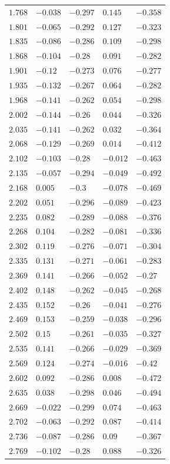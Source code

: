 \begin{center}
\begin{longtable}{lllll}
$1.768$&$-0.038$&$-0.297$&$0.145$&$-0.358$\\
$1.801$&$-0.065$&$-0.292$&$0.127$&$-0.323$\\
$1.835$&$-0.086$&$-0.286$&$0.109$&$-0.298$\\
$1.868$&$-0.104$&$-0.28$&$0.091$&$-0.282$\\
$1.901$&$-0.12$&$-0.273$&$0.076$&$-0.277$\\
$1.935$&$-0.132$&$-0.267$&$0.064$&$-0.282$\\
$1.968$&$-0.141$&$-0.262$&$0.054$&$-0.298$\\
$2.002$&$-0.144$&$-0.26$&$0.044$&$-0.326$\\
$2.035$&$-0.141$&$-0.262$&$0.032$&$-0.364$\\
$2.068$&$-0.129$&$-0.269$&$0.014$&$-0.412$\\
$2.102$&$-0.103$&$-0.28$&$-0.012$&$-0.463$\\
$2.135$&$-0.057$&$-0.294$&$-0.049$&$-0.492$\\
$2.168$&$0.005$&$-0.3$&$-0.078$&$-0.469$\\
$2.202$&$0.051$&$-0.296$&$-0.089$&$-0.423$\\
$2.235$&$0.082$&$-0.289$&$-0.088$&$-0.376$\\
$2.268$&$0.104$&$-0.282$&$-0.081$&$-0.336$\\
$2.302$&$0.119$&$-0.276$&$-0.071$&$-0.304$\\
$2.335$&$0.131$&$-0.271$&$-0.061$&$-0.283$\\
$2.369$&$0.141$&$-0.266$&$-0.052$&$-0.27$\\
$2.402$&$0.148$&$-0.262$&$-0.045$&$-0.268$\\
$2.435$&$0.152$&$-0.26$&$-0.041$&$-0.276$\\
$2.469$&$0.153$&$-0.259$&$-0.038$&$-0.296$\\
$2.502$&$0.15$&$-0.261$&$-0.035$&$-0.327$\\
$2.535$&$0.141$&$-0.266$&$-0.029$&$-0.369$\\
$2.569$&$0.124$&$-0.274$&$-0.016$&$-0.42$\\
$2.602$&$0.092$&$-0.286$&$0.008$&$-0.472$\\
$2.635$&$0.038$&$-0.298$&$0.046$&$-0.494$\\
$2.669$&$-0.022$&$-0.299$&$0.074$&$-0.463$\\
$2.702$&$-0.063$&$-0.292$&$0.087$&$-0.414$\\
$2.736$&$-0.087$&$-0.286$&$0.09$&$-0.367$\\
$2.769$&$-0.102$&$-0.28$&$0.088$&$-0.326$\\

\end{longtable}
\end{center}

